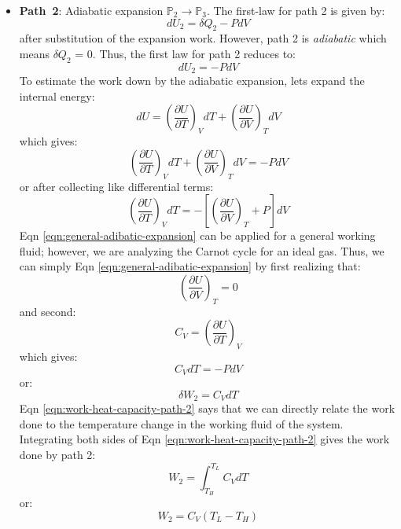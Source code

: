 \documentclass[11pt]{article}
\theoremstyle{definition}
\begin{document}
\begin{itemize}
\item{\textbf{Path~2}: Adiabatic expansion $\mathbb{P}_{2}\rightarrow\mathbb{P}_{3}$.
The first-law for path 2 is given by:
\begin{equation}
dU_{2} = \delta{Q}_{2} - PdV
\end{equation}after substitution of the expansion work. However, path 2 is \textit{adiabatic} which means $\delta{Q}_{2}$ = 0.
Thus, the first law for path 2 reduces to:
\begin{equation}
dU_{2} = -PdV
\end{equation}To estimate the work down by the adiabatic expansion, lets expand the internal energy:
\begin{equation}
		dU = \left(\frac{\partial{U}}{\partial{T}}\right)_{V}dT + \left(\frac{\partial{U}}{\partial{V}}\right)_{T}dV
\end{equation}which gives:
\begin{equation}
\left(\frac{\partial{U}}{\partial{T}}\right)_{V}dT + \left(\frac{\partial{U}}{\partial{V}}\right)_{T}dV = -PdV
\end{equation}or after collecting like differential terms:
\begin{equation}\label{eqn:general-adibatic-expansion}
\left(\frac{\partial{U}}{\partial{T}}\right)_{V}dT = -\left[ \left(\frac{\partial{U}}{\partial{V}}\right)_{T} + P\right]dV
\end{equation}Eqn \eqref{eqn:general-adibatic-expansion} can be applied for a general working fluid; however, we are analyzing the
Carnot cycle for an ideal gas. Thus, we can simply Eqn \eqref{eqn:general-adibatic-expansion} by first realizing that:
\begin{equation}
\left(\frac{\partial{U}}{\partial{V}}\right)_{T} = 0
\end{equation}and second:
\begin{equation}
C_{V} = \left(\frac{\partial{U}}{\partial{T}}\right)_{V}
\end{equation}which gives:
\begin{equation}
C_{V}dT = -PdV
\end{equation}or:
\begin{equation}\label{eqn:work-heat-capacity-path-2}
\delta{W}_{2} = C_{V}dT
\end{equation}
Eqn \eqref{eqn:work-heat-capacity-path-2} says that we can directly relate the work done to the temperature change in the working fluid of the system.
Integrating both sides of Eqn \eqref{eqn:work-heat-capacity-path-2} gives the work done by path 2:
\begin{equation}
W_{2} = \int_{T_{H}}^{T_{L}}C_{V}dT
\end{equation}or:
\begin{equation}
W_{2} = C_{V}\left(T_{L} - T_{H}\right)
\end{equation}}


\end{itemize}
\end{document}
